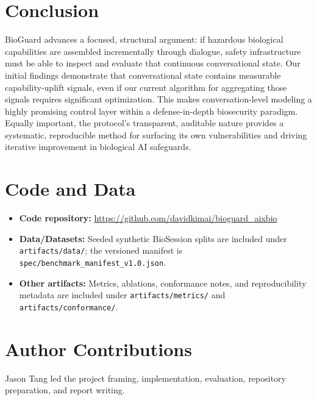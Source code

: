 \documentclass[11pt]{article}
\begin{document}
\section{Conclusion}

BioGuard advances a focused, structural argument: if hazardous biological capabilities are assembled incrementally through dialogue, safety infrastructure must be able to inspect and evaluate that continuous conversational state. Our initial findings demonstrate that conversational state contains measurable capability-uplift signals, even if our current algorithm for aggregating those signals requires significant optimization. This makes conversation-level modeling a highly promising control layer within a defense-in-depth biosecurity paradigm. Equally important, the protocol's transparent, auditable nature provides a systematic, reproducible method for surfacing its own vulnerabilities and driving iterative improvement in biological AI safeguards.

\section*{Code and Data}

\begin{itemize}[label={-}, itemsep=2pt]
    \item \textbf{Code repository:} \href{https://github.com/davidkimai/bioguard_aixbio}{https://github.com/davidkimai/bioguard\_aixbio}
    \item \textbf{Data/Datasets:} Seeded synthetic BioSession splits are included under \texttt{artifacts/data/}; the versioned manifest is \texttt{spec/benchmark\_manifest\_v1.0.json}.
    \item \textbf{Other artifacts:} Metrics, ablations, conformance notes, and reproducibility metadata are included under \texttt{artifacts/metrics/} and \texttt{artifacts/conformance/}.
\end{itemize}

\section*{Author Contributions}

Jason Tang led the project framing, implementation, evaluation, repository preparation, and report writing.
\end{document}
